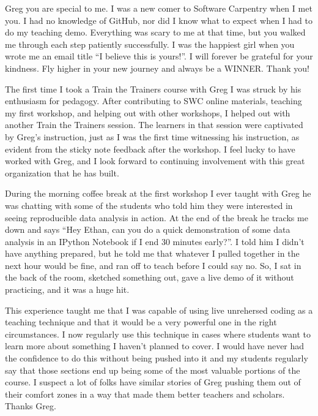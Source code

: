 
\newpage

Greg you are special to me. I was a new comer to Software Carpentry when I met
you. I had no knowledge of GitHub, nor did I know what to expect when I had to
do my teaching demo. Everything was scary to me at that time, but you walked me
through each step patiently successfully. I was the happiest girl when you
wrote me an email title ``I believe this is yours!''. I will forever be
grateful for your kindness. Fly higher in your new journey and always be a
WINNER. Thank you!


\newpage

The first time I took a Train the Trainers course with Greg I was struck by his
enthusiasm for pedagogy. After contributing to SWC online materials, teaching
my first workshop, and helping out with other workshops, I helped out with
another Train the Trainers session. The learners in that session were
captivated by Greg's instruction, just as I was the first time witnessing his
instruction, as evident from the sticky note feedback after the workshop. I
feel lucky to have worked with Greg, and I look forward to continuing
involvement with this great organization that he has built.


\newpage

During the morning coffee break at the first workshop I ever taught with Greg
he was chatting with some of the students who told him they were interested in
seeing reproducible data analysis in action. At the end of the break he tracks
me down and says ``Hey Ethan, can you do a quick demonstration of some data
analysis in an IPython Notebook if I end 30 minutes early?''. I told him I
didn't have anything prepared, but he told me that whatever I pulled together
in the next hour would be fine, and ran off to teach before I could say no. So,
I sat in the back of the room, sketched something out, gave a live demo of it
without practicing, and it was a huge hit.

This experience taught me that I was capable of using live unrehersed coding as
a teaching technique and that it would be a very powerful one in the right
circumstances. I now regularly use this technique in cases where students want
to learn more about something I haven't planned to cover. I would have never
had the confidence to do this without being pushed into it and my students
regularly say that those sections end up being some of the most valuable
portions of the course. I suspect a lot of folks have similar stories of Greg
pushing them out of their comfort zones in a way that made them better teachers
and scholars. Thanks Greg.

